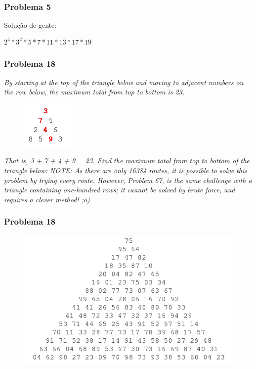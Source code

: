 \documentclass{beamer}
\begin{document}
\begin{frame}
    \frametitle{Problema 5}

    Solução de gente:

    \begin{center}
        $2^4 * 3^2 * 5 * 7 * 11 * 13 * 17 * 19$
    \end{center}

\end{frame}

\begin{frame}
    \frametitle{Problema 18}

    \begin{center}
        \textit{
            By starting at the top of the triangle below and moving to adjacent numbers on the row below, the maximum total from top to bottom is 23.
        }
        \begin{figure}[htpb]
            \includegraphics[width=0.2\linewidth]{images/p18_1.png}
        \end{figure}
        \textit{
            That is, 3 + 7 + 4 + 9 = 23.
            Find the maximum total from top to bottom of the triangle below:
            \footnotesize NOTE: As there are only 16384 routes, it is possible to solve this problem by trying every route. However, Problem 67, is the same challenge with a triangle containing one-hundred rows; it cannot be solved by brute force, and requires a clever method! ;o)
        }
    \end{center}

\end{frame}

\begin{frame}
    \frametitle{Problema 18}
    \begin{figure}[htpb]
        \centering
        \includegraphics[width=0.8\linewidth]{images/p18_2.png}
    \end{figure}
\end{frame}
\end{document}
